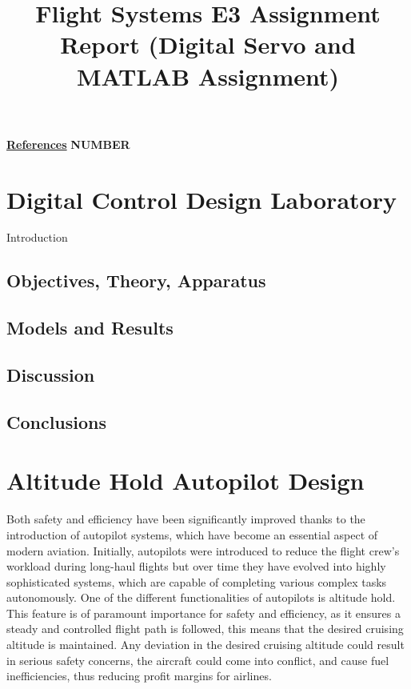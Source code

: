 \documentclass[stu, a4paper, 12pt, floatsintext]{apa7}
\title{Flight Systems E3 Assignment Report (Digital Servo and MATLAB Assignment)}
\numberwithin{figure}{section}
\numberwithin{table}{section}
\numberwithin{equation}{section}
\begin{document}
\maketitle{} %

\tableofcontents
\vspace*{0.1cm}
\noindent \hyperlink{page.54}{\textbf{References}} \hfill \textbf{NUMBER} %

\newpage
\section{Digital Control Design Laboratory}
Introduction
\subsection{Objectives, Theory, Apparatus}
\subsection{Models and Results}
\subsection{Discussion}
\subsection{Conclusions}

\newpage
\section{Altitude Hold Autopilot Design}
Both safety and efficiency have been significantly improved thanks to the introduction of autopilot systems, which have become an essential aspect of modern aviation. Initially, autopilots were introduced to reduce the flight crew’s workload during long-haul flights but over time they have evolved into highly sophisticated systems, which are capable of completing various complex tasks autonomously. One of the different functionalities of autopilots is altitude hold. This feature is of paramount importance for safety and efficiency, as it ensures a steady and controlled flight path is followed, this means that the desired cruising altitude is maintained. Any deviation in the desired cruising altitude could result in serious safety concerns, the aircraft could come into conflict, and cause fuel inefficiencies, thus reducing profit margins for airlines. \newline
\end{document}
